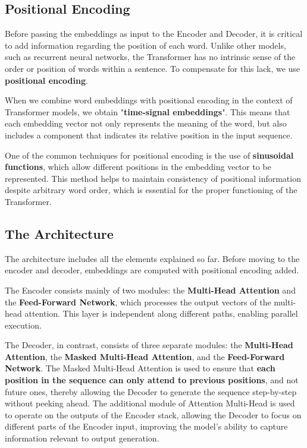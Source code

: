 \subsection{Positional Encoding}

Before passing the embeddings as input to the Encoder and Decoder, it is critical to add information regarding the position of each word. Unlike other models, such as recurrent neural networks, the Transformer has no intrinsic sense of the order or position of words within a sentence. To compensate for this lack, we use \textbf{positional encoding}.

When we combine word embeddings with positional encoding in the context of Transformer models, we obtain "\textbf{time-signal embeddings}". This means that each embedding vector not only represents the meaning of the word, but also includes a component that indicates its relative position in the input sequence. 

One of the common techniques for positional encoding is the use of \textbf{sinusoidal functions}, which allow different positions in the embedding vector to be represented. This method helps to maintain consistency of positional information despite arbitrary word order, which is essential for the proper functioning of the Transformer.


\subsection{The Architecture}

The architecture includes all the elements explained so far. Before moving to the encoder and decoder, embeddings are computed with positional encoding added.

The Encoder consists mainly of two modules: the \textbf{Multi-Head Attention} and the \textbf{Feed-Forward Network}, which processes the output vectors of the multi-head attention. This layer is independent along different paths, enabling parallel execution.

The Decoder, in contrast, consists of three separate modules: the \textbf{Multi-Head Attention}, the \textbf{Masked Multi-Head Attention}, and the \textbf{Feed-Forward Network}.
The Masked Multi-Head Attention is used to ensure that \textbf{each position in the sequence can only attend to previous positions}, and not future ones, thereby allowing the Decoder to generate the sequence step-by-step without peeking ahead. The additional module of Attention Multi-Head is used to operate on the outputs of the Encoder stack, allowing the Decoder to focus on different parts of the Encoder input, improving the model's ability to capture information relevant to output generation.

